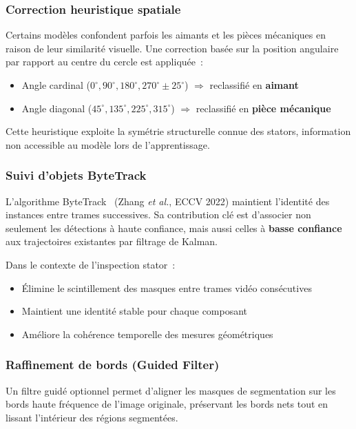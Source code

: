 \documentclass[12pt,a4paper]{report}
\begin{document}
\subsubsection{Correction heuristique spatiale}

Certains mod\`eles confondent parfois les aimants et les pi\`eces m\'ecaniques en raison de leur similarit\'e visuelle. Une correction bas\'ee sur la position angulaire par rapport au centre du cercle est appliqu\'ee~:
\begin{itemize}
    \item Angle cardinal ($0^{\circ}, 90^{\circ}, 180^{\circ}, 270^{\circ} \pm 25^{\circ}$) $\Rightarrow$ reclassifi\'e en \textbf{aimant}
    \item Angle diagonal ($45^{\circ}, 135^{\circ}, 225^{\circ}, 315^{\circ}$) $\Rightarrow$ reclassifi\'e en \textbf{pi\`ece m\'ecanique}
\end{itemize}

Cette heuristique exploite la sym\'etrie structurelle connue des stators, information non accessible au mod\`ele lors de l'apprentissage.

\subsubsection{Suivi d'objets ByteTrack}

L'algorithme ByteTrack~\cite{zhang2022bytetrack} (Zhang \textit{et al.}, ECCV 2022) maintient l'identit\'e des instances entre trames successives. Sa contribution cl\'e est d'associer non seulement les d\'etections \`a haute confiance, mais aussi celles \`a \textbf{basse confiance} aux trajectoires existantes par filtrage de Kalman.

Dans le contexte de l'inspection stator~:
\begin{itemize}
    \item \'Elimine le scintillement des masques entre trames vid\'eo cons\'ecutives
    \item Maintient une identit\'e stable pour chaque composant
    \item Am\'eliore la coh\'erence temporelle des mesures g\'eom\'etriques
\end{itemize}

\subsubsection{Raffinement de bords (Guided Filter)}

Un filtre guid\'e optionnel permet d'aligner les masques de segmentation sur les bords haute fr\'equence de l'image originale, pr\'eservant les bords nets tout en lissant l'int\'erieur des r\'egions segment\'ees.
\end{document}
